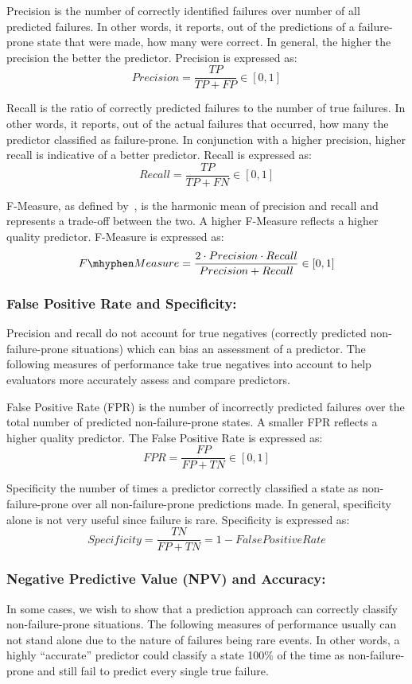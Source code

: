 Precision is the number of correctly identified failures over number of all predicted failures.  In other words, it reports, out of the predictions of a failure-prone state that were made, how many were correct.  In general, the higher the precision the better the predictor.  Precision is expressed as:
\[ Precision 
	= \dfrac{TP}{TP + FP} \in [0,1]
\]

Recall is the ratio of correctly predicted failures to the number of true failures.  In other words, it reports, out of the actual failures that occurred, how many the predictor classified as failure-prone.  In conjunction with a higher precision, higher recall is indicative of a better predictor.  Recall is expressed as:
\[ Recall 
	= \dfrac{TP}{TP + FN} \in [0,1]
\]

F-Measure, as defined by~\cite{rijsbergen1979v}, is the harmonic mean of precision and recall and represents a trade-off between the two.  A higher F-Measure reflects a higher quality predictor.  F-Measure is expressed as:
\[ F\mhyphen Measure 
	= \dfrac{2 \cdot Precision \cdot Recall}{Precision + Recall} \in [0,1]
\]

\subsubsection{False Positive Rate and Specificity:}
Precision and recall do not account for true negatives (correctly predicted non-failure-prone situations) which can bias an assessment of a predictor.  The following measures of performance take true negatives into account to help evaluators more accurately assess and compare predictors.

False Positive Rate (FPR) is the number of incorrectly predicted failures over the total number of predicted non-failure-prone states.  A smaller FPR reflects a higher quality predictor.  The False Positive Rate is expressed as:
\[ \mathit{FPR}
	= \dfrac{FP}{FP + TN} \in [0,1]
\]

Specificity the number of times a predictor correctly classified a state as non-failure-prone over all non-failure-prone predictions made.  In general, specificity alone is not very useful since failure is rare.  Specificity is expressed as:
\[ Specificity 
	= \dfrac{TN}{FP + TN} = 1 - False Positive Rate
\]

\subsubsection{Negative Predictive Value (NPV) and Accuracy:}
In some cases, we wish to show that a prediction approach can correctly classify non-failure-prone situations.  The following measures of performance usually can not stand alone due to the nature of failures being rare events.  In other words, a highly ``accurate'' predictor could classify a state 100\% of the time as non-failure-prone and still fail to predict every single true failure.


